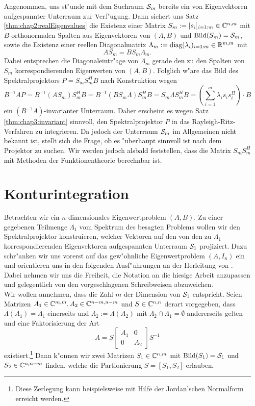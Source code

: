 Angenommen, uns st"unde mit dem Suchraum $\S_m$ bereits ein von Eigenvektoren
aufgespannter Unterraum zur Verf"ugung. Dann sichert uns Satz \ref{thm:chap2:realEigenvalues} die Existenz einer Matrix $S_m := [s_i]_{i=1:m}\in\C^{n,m}$ mit
$B$-orthonormalen Spalten aus Eigenvektoren von $(A,B)$ und $\Bild(S_m)=\S_m$, sowie die Existenz einer reellen Diagonalmatrix
$\Lambda_m := \text{diag}(\lambda_i)_{i=1:m}\in\R^{m,m}$ mit
\[
AS_m = BS_m\Lambda_m.
\]
Dabei entsprechen die Diagonaleintr"age von $\Lambda_m$ gerade den zu den Spalten
von $S_m$ korrespondierenden Eigenwerten von $(A,B)$. Folglich w"are das Bild
des Spektralprojektors $P=S_m S_m^H B$ nach Konstruktion wegen
\[
B^{-1}AP = B^{-1}(AS_m)S_m^H B = B^{-1}(BS_m \Lambda)S_m^H B
= S_m\Lambda S_m^H B = \left(\sum_{i=1}^m \lambda_i s_i s_i^H\right)\cdot B
\]
ein $(B^{-1}A)$-invarianter Unterraum. Daher erscheint es
wegen Satz \ref{thm:chap3:invariant} sinnvoll, den Spektralprojektor $P$ in das
Rayleigh-Ritz-Verfahren zu integrieren.
Da jedoch der Unterraum $\S_m$ im Allgemeinen nicht bekannt ist, stellt sich die Frage, ob es
"uberhaupt sinnvoll ist nach dem Projektor zu suchen.
Wir werden jedoch alsbald feststellen, dass %
die Matrix $S_m S_m^H$ mit Methoden der Funktionentheorie berechnbar ist.

\section{Konturintegration}\label{sec:chap3:konturintegration}

Betrachten wir ein $n$-dimensionales Eigenwertproblem $(A,B)$. Zu einer gegebenen Teilmenge $\Lambda_1$ vom Spektrum des besagten Problems wollen wir
den Spektralprojektor konstruieren, welcher Vektoren auf den von den zu $\Lambda_1$ korrespondierenden Eigenvektoren aufgespannten Unterraum $\S_1$ projiziert.
Dazu schr"anken wir uns vorerst auf das gew"ohnliche Eigenwertproblem $(A,I_n)$ ein und orientieren
uns in
den folgenden Ausf"uhrungen an der Herleitung von \cite[Abschnitt 4.9]{liesen}.
Dabei nehmen wir uns die Freiheit, die Notation an die hiesige Arbeit anzupassen und gelegentlich von den vorgeschlagenen Schreibweisen abzuweichen.\\

Wir wollen annehmen, dass die Zahl $m$ der Dimension von $\S_1$ entspricht. Seien Matrizen $A_1\in\C^{m,m},
A_2\in\C^{n-m,n-m}$ und $S\in\Cnn$ derart vorgegeben, dass  $\Lambda(A_1) = \Lambda_1$ einerseits und $\Lambda_2 := \Lambda(A_2)$ mit $\Lambda_2 \cap \Lambda_1 = \emptyset$ andererseits gelten und eine Faktorisierung der Art
\begin{equation}\label{eq:chap3:factorization}
A = S\begin{bmatrix} A_1 & 0 \\ 0 & A_2 \end{bmatrix} S^{-1}
\end{equation}
existiert.\footnote{Diese Zerlegung kann beispielsweise mit Hilfe der Jordan'schen Normalform erreicht werden.}
Dann k"onnen wir zwei Matrizen $S_1 \in \C^{n,m}$ mit $\Bild(S_1) = \S_1$ und
$S_2 \in \C^{n,n-m}$ finden, welche die Partionierung $S=[S_1, S_2]$ erlauben.

